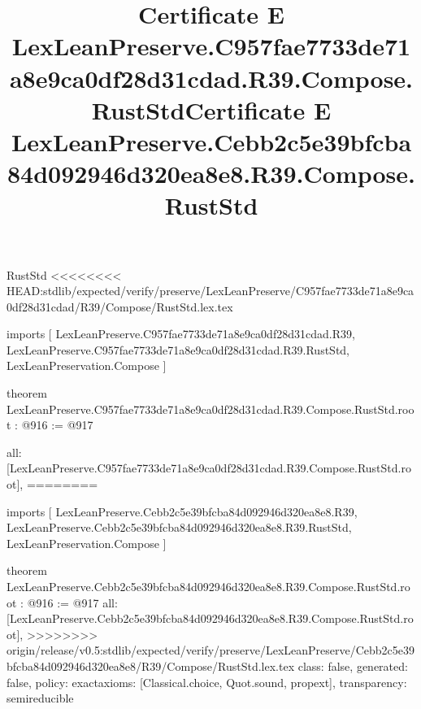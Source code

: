 \begin{lexlean}{RustStd}
<<<<<<<< HEAD:stdlib/expected/verify/preserve/LexLeanPreserve/C957fae7733de71a8e9ca0df28d31cdad/R39/Compose/RustStd.lex.tex
\title{Certificate E LexLeanPreserve.C957fae7733de71a8e9ca0df28d31cdad.R39.Compose.RustStd}
\begin{coremodule}
imports [
  LexLeanPreserve.C957fae7733de71a8e9ca0df28d31cdad.R39,
  LexLeanPreserve.C957fae7733de71a8e9ca0df28d31cdad.R39.RustStd,
  LexLeanPreservation.Compose
]

theorem LexLeanPreserve.C957fae7733de71a8e9ca0df28d31cdad.R39.Compose.RustStd.root : @916 := @917 {
  all: [LexLeanPreserve.C957fae7733de71a8e9ca0df28d31cdad.R39.Compose.RustStd.root],
========
\title{Certificate E LexLeanPreserve.Cebb2c5e39bfcba84d092946d320ea8e8.R39.Compose.RustStd}
\begin{coremodule}
imports [
  LexLeanPreserve.Cebb2c5e39bfcba84d092946d320ea8e8.R39,
  LexLeanPreserve.Cebb2c5e39bfcba84d092946d320ea8e8.R39.RustStd,
  LexLeanPreservation.Compose
]

theorem LexLeanPreserve.Cebb2c5e39bfcba84d092946d320ea8e8.R39.Compose.RustStd.root : @916 := @917 {
  all: [LexLeanPreserve.Cebb2c5e39bfcba84d092946d320ea8e8.R39.Compose.RustStd.root],
>>>>>>>> origin/release/v0.5:stdlib/expected/verify/preserve/LexLeanPreserve/Cebb2c5e39bfcba84d092946d320ea8e8/R39/Compose/RustStd.lex.tex
  class: false,
  generated: false,
  policy: exact{axioms: [Classical.choice, Quot.sound, propext]},
  transparency: semireducible
}


\end{coremodule}}
\end{coremodule}
\end{lexlean}
